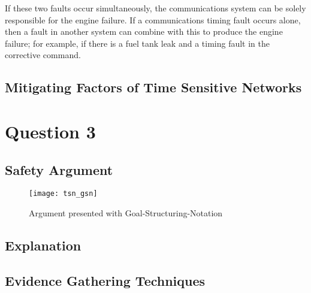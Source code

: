 If these two faults occur simultaneously, the communications system can be solely responsible for the engine failure.
If a communications timing fault occurs alone, then a fault in another system can combine with this to produce the engine failure; for example, if there is a fuel tank leak and a timing fault in the corrective command.

\subsection{Mitigating Factors of Time Sensitive Networks}

\section{Question 3}

\subsection{Safety Argument}

\begin{figure}[h]
\centering
\texttt{[image: tsn\_gsn]}
\caption{Argument presented with Goal-Structuring-Notation}
\end{figure}

\subsection{Explanation}

\subsection{Evidence Gathering Techniques}
